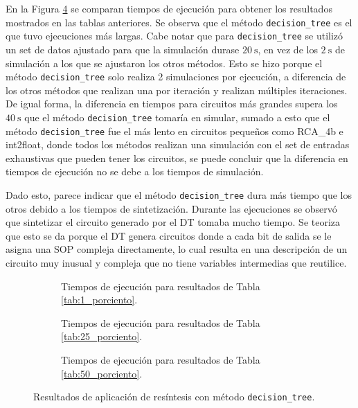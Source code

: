 
En la Figura \ref{fig:comparacion_tiempos} se comparan
tiempos de ejecución para obtener los resultados mostrados en las tablas
anteriores. Se observa que el método \texttt{decision\_tree} es el que tuvo
ejecuciones más largas. Cabe notar que para \texttt{decision\_tree} se utilizó
un set de datos ajustado para que la simulación durase $\SI{20}{\second}$, en
vez de los $\SI{2}{\second}$ de simulación a los que se ajustaron los otros
métodos. Esto se hizo porque el método \texttt{decision\_tree} solo realiza 2
simulaciones por ejecución, a diferencia de los otros métodos que realizan una
por iteración y realizan múltiples iteraciones. De igual forma, la diferencia
en tiempos para circuitos más grandes supera los $\SI{40}{\second}$ que el
método \texttt{decision\_tree} tomaría en simular, sumado a esto que el método
\texttt{decision\_tree} fue el más lento en circuitos pequeños como RCA\_4b e
int2float, donde todos los métodos realizan una simulación con el set de
entradas exhaustivas que pueden tener los circuitos, se puede concluir que la
diferencia en tiempos de ejecución no se debe a los tiempos de simulación.

Dado esto, parece indicar que el método \texttt{decision\_tree} dura más tiempo
que los otros debido a los tiempos de sintetización. Durante las ejecuciones se
observó que sintetizar el circuito generado por el DT tomaba mucho tiempo. Se
teoriza que esto se da porque el DT genera circuitos donde a cada bit de salida
se le asigna una SOP compleja directamente, lo cual resulta en una descripción
de un circuito muy inusual y compleja que no tiene variables intermedias que
reutilice.

\begin{figure}
  \centering
  \begin{subfigure}{0.75\textwidth}
    \centering
    
    \caption{Tiempos de ejecución para resultados de Tabla \ref{tab:1_porciento}.}
    \label{fig:01_tiempo}
  \end{subfigure}
  \begin{subfigure}{0.75\textwidth}
    \centering
    
    \caption{Tiempos de ejecución para resultados de Tabla \ref{tab:25_porciento}.}
    \label{fig:25_tiempo}
  \end{subfigure}
  \begin{subfigure}{0.75\textwidth}
    \centering
    
    \caption{Tiempos de ejecución para resultados de Tabla \ref{tab:50_porciento}.}
    \label{fig:50_tiempo}
  \end{subfigure}
  \caption{Resultados de aplicación de resíntesis con método \texttt{decision\_tree}.}
  \label{fig:comparacion_tiempos}
\end{figure}

